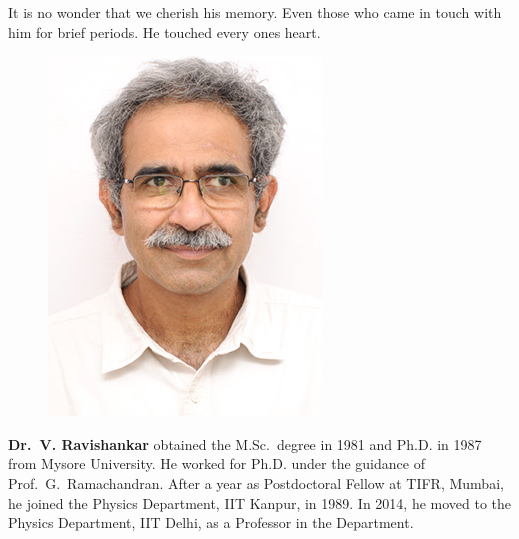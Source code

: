 It is no wonder that we cherish his memory. Even those who came in touch with him for brief periods. He touched every ones heart.
\medskip

\begin{figure}%
\vspace{-4\baselineskip}
\includegraphics[scale=.3]{authorsphotos/V_Ravishankar.jpg}
\end{figure}%
\noindent
\textbf{Dr.\ V. Ravishankar} obtained the M.Sc.\ degree in 1981 and Ph.D. in 1987 from Mysore University. He worked for Ph.D. under the guidance of Prof.\ G.\ Ramachandran. After a year as Postdoctoral Fellow at TIFR, Mumbai, he joined the Physics Department, IIT Kanpur, in 1989. In 2014, he moved to the Physics Department, IIT Delhi, as a Professor in the Department.


